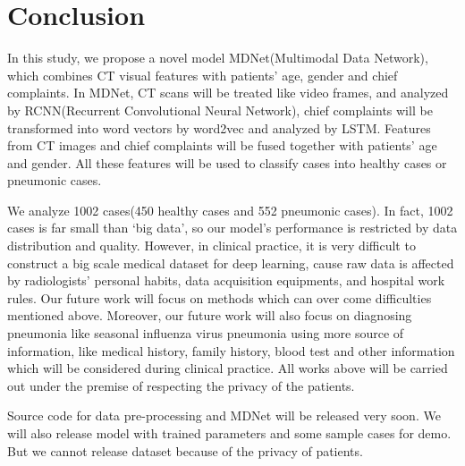 \documentclass[journal]{IEEEtran}
\begin{document}
\section{Conclusion}
\label{conclude}
In this study, we propose a novel model MDNet(Multimodal Data Network), which combines CT visual features with patients' age, gender and chief complaints. In MDNet, CT scans will be treated like video frames, and analyzed by RCNN(Recurrent Convolutional Neural Network), chief complaints will be transformed into word vectors by word2vec and analyzed by LSTM. Features from CT images and chief complaints will be fused together with patients' age and gender. All these features will be used to classify cases into healthy cases or pneumonic cases.

We analyze 1002 cases(450 healthy cases and 552 pneumonic cases). In fact, 1002 cases is far small than `big data', so our model's performance is restricted by data distribution and quality. However, in clinical practice, it is very difficult to construct a big scale medical dataset for deep learning, cause raw data is affected by radiologists' personal habits, data acquisition equipments, and hospital work rules. Our future work will focus on methods which can over come difficulties mentioned above.
Moreover, our future work will also focus on diagnosing pneumonia like seasonal influenza virus pneumonia using more source of information, like medical history, family history, blood test and other information which will be considered during clinical practice. All works above will be carried out under the premise of respecting the privacy of the patients.
 
Source code for data pre-processing and MDNet will be released very soon. We will also release model with trained parameters and some sample cases for demo. But we cannot release dataset because of the privacy of patients. 


%
%
\end{document}
